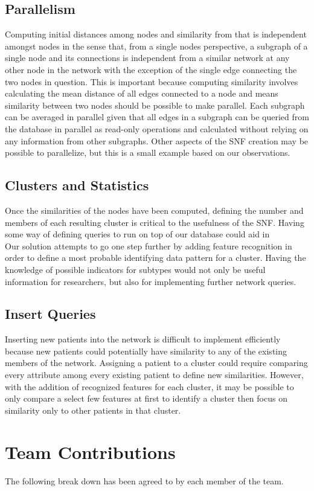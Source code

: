 \documentclass[12pt]{article}
\begin{document}
\subsection*{Parallelism}
\quad Computing initial distances among nodes and similarity from that is independent amongst nodes in the sense that, from a single nodes perspective, a subgraph of a single node and its connections is independent from a similar network at any other node in the network with the exception of the single edge connecting the two nodes in question. This is important because computing similarity involves calculating the mean distance of all edges connected to a node and means similarity between two nodes should be possible to make parallel. Each subgraph  can be averaged in parallel given that all edges in a subgraph can be queried from the database in parallel as read-only operations and calculated without relying on any information from other subgraphs. Other aspects of the SNF creation may be possible to parallelize, but this is a small example based on our observations.
\subsection*{Clusters and Statistics}
\quad Once the similarities of the nodes have been computed, defining the number and members of each resulting cluster is critical to the usefulness of the SNF. Having some way of defining queries to run on top of our database could aid in \\
\quad Our solution attempts to go one step further by adding feature recognition in order to define a most probable identifying data pattern for a cluster. Having the knowledge of possible indicators for subtypes would not only be useful information for researchers, but also for implementing further network queries.
\subsection*{Insert Queries}
\quad Inserting new patients into the network is difficult to implement efficiently because new patients could potentially have similarity to any of the existing members of the network. Assigning a patient to a cluster could require comparing every attribute among every existing patient to define new similarities. However, with the addition of recognized features for each cluster, it may be possible to only compare a select few features at first to identify a cluster then focus on similarity only to other patients in that cluster. 
\section*{Team Contributions}
The following break down has been agreed to by each member of the team.
\end{document}
